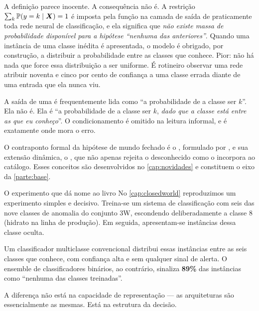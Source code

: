 A definição parece inocente. A consequência não é. A restrição
$\sum_k \mathbb{P}(y=k \mid \bm{X}) = 1$ é imposta pela função  na camada de
saída de praticamente toda rede neural de classificação, e ela significa que \emph{não
existe massa de probabilidade disponível para a hipótese ``nenhuma das anteriores''}.
Quando uma instância de uma classe inédita é apresentada, o modelo é obrigado, por
construção, a distribuir a probabilidade entre as classes que conhece. Pior: não há
nada que force essa distribuição a ser uniforme. É rotineiro observar uma rede
atribuir noventa e cinco por cento de confiança a uma classe errada diante de uma
entrada que ela nunca viu.

\begin{destaque}
A saída de uma  é frequentemente lida como ``a probabilidade de a classe
ser $k$''. Ela não é. Ela é ``a probabilidade de a classe ser $k$, \emph{dado que a
classe está entre as que eu conheço}''. O condicionamento é omitido na leitura
informal, e é exatamente onde mora o erro.
\end{destaque}

O contraponto formal da hipótese de mundo fechado é o , formulado por \citet{Scheirer2013}, e sua extensão
dinâmica, o , que não apenas
rejeita o desconhecido como o incorpora ao catálogo. Esses conceitos são desenvolvidos
no \cref{cap:novidades} e constituem o eixo da \cref{parte:base}.

\begin{exemplo}{O experimento que dá nome ao livro}
No \cref{cap:closedworld} reproduzimos um experimento simples e decisivo. Treina-se um
sistema de classificação com seis das nove classes de anomalia do conjunto 3W,
escondendo deliberadamente a classe 8 (hidrato na linha de produção). Em seguida,
apresentam-se instâncias dessa classe oculta.

Um classificador multiclasse convencional distribui essas instâncias entre as seis
classes que conhece, com confiança alta e sem qualquer sinal de alerta. O ensemble de
classificadores binários, ao contrário, sinaliza \textbf{89\%} das instâncias como
``nenhuma das classes treinadas''.

A diferença não está na capacidade de representação --- as arquiteturas são
essencialmente as mesmas. Está na estrutura da decisão.
\end{exemplo}

